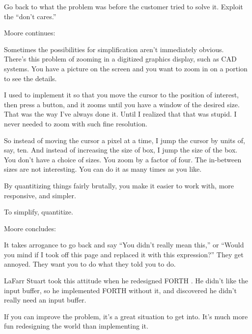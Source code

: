 \begin{tip}
Go back to what the problem was before the customer tried to solve it.
Exploit the ``don't cares.''
\end{tip}




\bigskip\blackline{2ex}
\noindent Moore continues:

\begin{tfquot}
Sometimes the possibilities for simplification aren't immediately
obvious.\\
There's this problem of zooming in a digitized graphics display, such
as CAD systems. You have a picture on the screen and you want to zoom
in on a portion to see the details.

I used to implement it so that you move the cursor to the position of
interest, then press a button, and it zooms until you have a window of
the desired size. That was the way I've always done it. Until I
realized that that was stupid. I never needed to zoom with such fine
resolution.

So instead of moving the cursor a pixel at a time, I jump the cursor
by units of, say, ten. And instead of increasing the size of box, I
jump the size of the box. You don't have a choice of sizes. You zoom
by a factor of four. The in-between sizes are not interesting. You can
do it as many times as you like.

By quantitizing things fairly brutally, you make it easier to work with,
more responsive, and simpler.
\end{tfquot}
\blackline{2ex}

\begin{tip}
To simplify, quantitize.
\end{tip}

\bigskip\blackline{2ex}
\noindent Moore concludes:
\begin{tfquot}
It takes arrogance to go back and say ``You didn't really mean this,''
or ``Would you mind if I took off this page and replaced it with this
expression?'' They get annoyed. They want you to do what they told you
to do.

LaFarr Stuart took this attitude when he redesigned FORTH \cite{stuart80}. He
didn't like the input buffer, so he implemented FORTH without it, and
discovered he didn't really need an input buffer.

If you can improve the problem, it's a great situation to get into.
It's much more fun redesigning the world than implementing it.
\end{tfquot}
\blackline{2ex}

